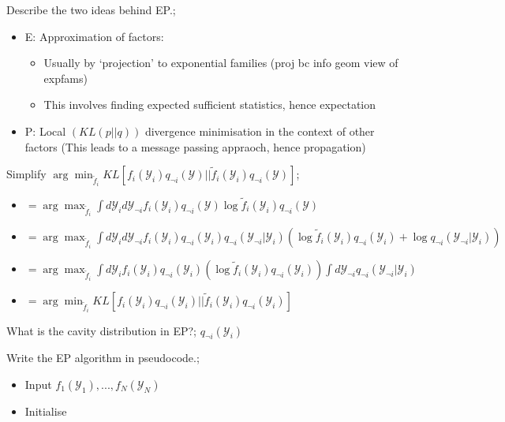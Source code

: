 \documentclass{article}
\begin{document}
Describe the two ideas behind EP.; \begin{itemize}
    \item E: Approximation of factors: \begin{itemize}
        \item Usually by `projection' to exponential families (proj bc info geom view of expfams)
        \item This involves finding expected sufficient statistics, hence expectation
    \end{itemize}
    \item P: Local $(KL(p||q))$ divergence minimisation in the context of other factors (This leads to a message passing appraoch, hence propagation)
\end{itemize}

Simplify $\arg\min_{\tilde{f}_i}KL[f_i(\mathcal{Y}_i)q_{\neg i}(\mathcal{Y})||\tilde{f}_i(\mathcal{Y}_i)q_{\neg i}(\mathcal{Y})]$; \begin{itemize}
    \item $=\arg\max_{\tilde{f}_i} \int d\mathcal{Y}_i d\mathcal{Y}_{\neg i} f_i(\mathcal{Y}_i)q_{\neg i}(\mathcal{Y})\log \tilde{f}_i(\mathcal{Y}_i) q_{\neg i}(\mathcal{Y})$
    \item $=\arg\max_{\tilde{f}_i} \int d\mathcal{Y}_i d\mathcal{Y}_{\neg i} f_i(\mathcal{Y}_i)q_{\neg i}(\mathcal{Y}_i)q_{\neg i}(\mathcal{Y}_{\neg i}|\mathcal{Y}_i)(\log \tilde{f}_i(\mathcal{Y}_i)q_{\neg i}(\mathcal{Y}_i)+\log q_{\neg i}(\mathcal{Y}_{\neg i}|\mathcal{Y}_i))$
    \item $=\arg\max_{\tilde{f}_i} \int d\mathcal{Y}_i f_i(\mathcal{Y}_i)q_{\neg i}(\mathcal{Y}_i)(\log \tilde{f}_i(\mathcal{Y}_i)q_{\neg i}(\mathcal{Y}_i)) \int d\mathcal{Y}_{\neg i} q_{\neg i}(\mathcal{Y}_{\neg i}|\mathcal{Y}_i)$
    \item $=\arg\min_{\tilde{f}_i}KL[f_i(\mathcal{Y}_i)q_{\neg i}(\mathcal{Y}_i)||\tilde{f}_i(\mathcal{Y}_i)q_{\neg i}(\mathcal{Y}_i)]$
\end{itemize}

What is the cavity distribution in EP?; $q_{\neg i}(\mathcal{Y}_i)$

Write the EP algorithm in pseudocode.; \begin{itemize}
    \item Input $f_1(\mathcal{Y}_1), ..., f_N(\mathcal{Y}_N)$
    \item Initialise 
\end{itemize}
\end{document}
